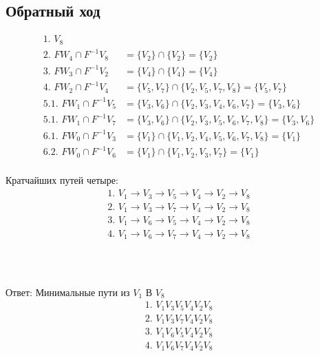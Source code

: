 \documentclass{article}
\begin{document}
\begin{tikzpicture}[x=0.75pt,y=0.75pt,yscale=-1,xscale=1]
\end{tikzpicture}

\newpage
\subsection*{Обратный ход}
\begin{align*}
    \text{1.    } V_8\\
    \text{2.    } FW_4 \cap F^{-1}V_8 &= 
    \{V_2\} \cap \{V_2\} = \{V_2\} \\
    \text{3.    } FW_3 \cap F^{-1}V_2 &= 
    \{V_4\} \cap \{V_4\} = \{V_4\} \\
    \text{4.    } FW_2 \cap F^{-1}V_4 &= 
    \{V_5, V_7\} \cap \{V_2, V_5, V_7, V_8\} = \{V_5, V_7\} \\
    \text{5.1.  } FW_1 \cap F^{-1}V_5 &= 
    \{V_3, V_6\} \cap \{V_2, V_3, V_4, V_6, V_7\} = \{V_3, V_6\} \\
    \text{5.1.  } FW_1 \cap F^{-1}V_7 &= 
    \{V_3, V_6\} \cap \{V_2, V_3, V_5, V_6, V_7, V_8\} = \{V_3, V_6\} \\
    \text{6.1.  } FW_0 \cap F^{-1}V_3 &= 
    \{V_1\} \cap \{V_1, V_2, V_4, V_5, V_6, V_7, V_8\} = \{V_1\} \\
    \text{6.2.  } FW_0 \cap F^{-1}V_6 &= 
    \{V_1\} \cap \{V_1, V_2, V_3, V_7\} = \{V_1\} \\
\end{align*}

Кратчайших путей четыре:
\begin{align*}
    \text{1.    } V_1 \rightarrow V_3 \rightarrow V_5 \rightarrow V_4 \rightarrow V_2 \rightarrow V_8\\
    \text{2.    } V_1 \rightarrow V_3 \rightarrow V_7 \rightarrow V_4 \rightarrow V_2 \rightarrow V_8\\
    \text{3.    } V_1 \rightarrow V_6 \rightarrow V_5 \rightarrow V_4 \rightarrow V_2 \rightarrow V_8\\
    \text{4.    } V_1 \rightarrow V_6 \rightarrow V_7 \rightarrow V_4 \rightarrow V_2 \rightarrow V_8\\
\end{align*}
\\\\\\
Ответ: Минимальные пути из $V_1$ В $V_8$
\begin{align*}
    \text{1.    } V_1 V_3 V_5 V_4 V_2 V_8\\
    \text{2.    } V_1 V_3 V_7 V_4 V_2 V_8\\
    \text{3.    } V_1 V_6 V_5 V_4 V_2 V_8\\
    \text{4.    } V_1 V_6 V_7 V_4 V_2 V_8\\
\end{align*}
\end{document}
